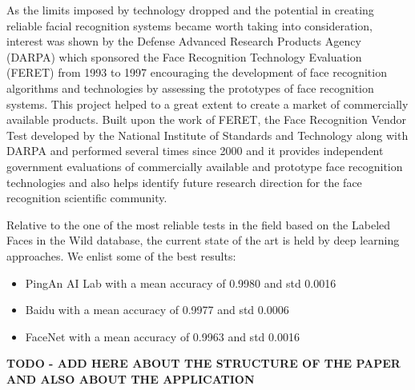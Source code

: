 As the limits imposed by technology dropped and the potential in creating reliable facial recognition systems became worth taking into consideration, interest was shown by the Defense Advanced Research Products Agency (DARPA) which sponsored the Face Recognition Technology Evaluation (FERET) \cite{PhillipsJMHRSRP00} from 1993 to 1997 encouraging the development of face recognition algorithms and technologies by assessing the prototypes of face recognition systems. This project helped to a great extent to create a market of commercially available products.
Built upon the work of FERET, the Face Recognition Vendor Test \cite{PhillipsGMBTB03} developed by the National Institute of Standards and Technology \cite{FaceNist} along with DARPA and performed several times since 2000 and it provides independent government evaluations of commercially available and prototype face recognition technologies and also helps identify future research direction for the face recognition scientific community.

Relative to the one of the most reliable tests in the field based on the Labeled Faces in the Wild database, the current state of the art is held by deep learning approaches. We enlist some of the best results:
\begin{itemize}
	\item PingAn AI Lab with a mean accuracy of 0.9980 and std 0.0016
	\item Baidu with a mean accuracy of 0.9977 and std 0.0006
	\item FaceNet with a mean accuracy of 0.9963 and std 0.0016
\end{itemize}


\textbf{TODO - ADD HERE ABOUT THE STRUCTURE OF THE PAPER AND ALSO ABOUT THE APPLICATION}